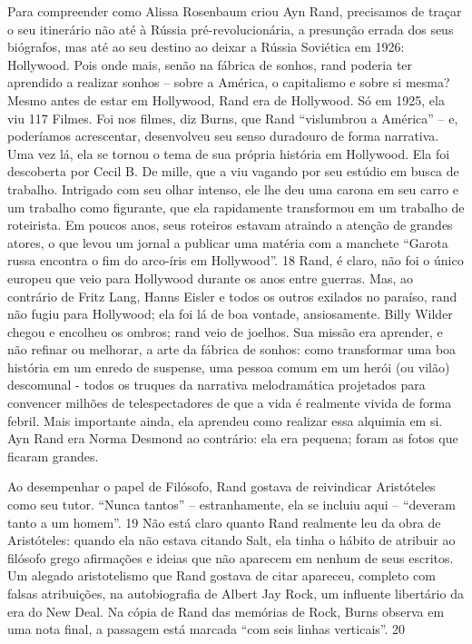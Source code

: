 Para compreender como Alissa Rosenbaum criou Ayn Rand, precisamos de traçar o seu itinerário não até à Rússia pré-revolucionária, a presunção errada dos seus biógrafos, mas até ao seu destino ao deixar a Rússia Soviética em 1926: Hollywood. Pois onde mais, senão na fábrica de sonhos, rand poderia ter aprendido a realizar sonhos – sobre a América, o capitalismo e sobre si mesma? Mesmo antes de estar em Hollywood, Rand era de Hollywood. Só em 1925, ela viu
 {\color{blue} 117}  
Filmes. Foi nos filmes, diz Burns, que Rand “vislumbrou a América” – e, poderíamos acrescentar, desenvolveu seu senso duradouro de forma narrativa. Uma vez lá, ela se tornou o tema de sua própria história em Hollywood. Ela foi descoberta por Cecil B. De mille, que a viu vagando por seu estúdio em busca de trabalho. Intrigado com seu olhar intenso, ele lhe deu uma carona em seu carro e um trabalho como figurante, que ela rapidamente transformou em um trabalho de roteirista. Em poucos anos, seus roteiros estavam atraindo a atenção de grandes atores, o que levou um jornal a publicar uma matéria com a manchete “Garota russa encontra o fim do arco-íris em Hollywood”.
 {\color{blue} 18}  
Rand, é claro, não foi o único europeu que veio para Hollywood durante os anos entre guerras. Mas, ao contrário de Fritz Lang, Hanns Eisler e todos os outros exilados no paraíso, rand não fugiu para Hollywood; ela foi lá de boa vontade, ansiosamente. Billy Wilder chegou e encolheu os ombros; rand veio de joelhos. Sua missão era aprender, e não refinar ou melhorar, a arte da fábrica de sonhos: como transformar uma boa história em um enredo de suspense, uma pessoa comum em um herói (ou vilão) descomunal - todos os truques da narrativa melodramática projetados para convencer milhões de telespectadores de que a vida é realmente vivida de forma febril. Mais importante ainda, ela aprendeu como realizar essa alquimia em si. Ayn Rand era Norma Desmond ao contrário: ela era pequena; foram as fotos que ficaram grandes.
 
\par
 
Ao desempenhar o papel de Filósofo, Rand gostava de reivindicar Aristóteles como seu tutor. “Nunca tantos” – estranhamente, ela se incluiu aqui – “deveram tanto a um homem”.
 {\color{blue} 19}  
Não está claro quanto Rand realmente leu da obra de Aristóteles: quando ela não estava citando Salt, ela tinha o hábito de atribuir ao filósofo grego afirmações e ideias que não aparecem em nenhum de seus escritos. Um alegado aristotelismo que Rand gostava de citar apareceu, completo com falsas atribuições, na autobiografia de Albert Jay Rock, um influente libertário da era do New Deal. Na cópia de Rand das memórias de Rock, Burns observa em uma nota final, a passagem está marcada “com seis linhas verticais”.
 {\color{blue} 20}  

